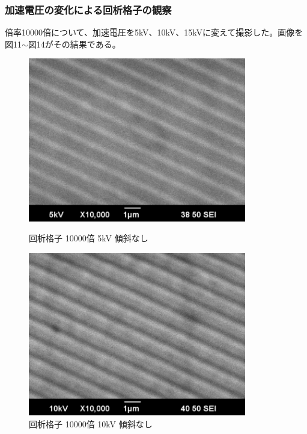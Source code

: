 \documentclass[a4paper,11pt]{jsarticle}
\begin{document}
\subsubsection{加速電圧の変化による回析格子の観察}
倍率10000倍について、加速電圧を5kV、10kV、15kVに変えて撮影した。画像を図11$\sim$図14がその結果である。\\
\begin{figure}[H]
  \begin{minipage}{0.5\hsize}
    \begin{center}
      \includegraphics[width=0.85\textwidth]{figs/0523/kaisetukousi/10000_5kv.pdf}
    \end{center}
    \caption{回析格子 10000倍 5kV 傾斜なし}
  \end{minipage}
  \begin{minipage}{0.5\hsize}
    \begin{center}
      \includegraphics[width=0.85\textwidth]{figs/0523/kaisetukousi/10000_10kv.pdf}
    \end{center}
    \caption{回析格子 10000倍 10kV 傾斜なし}
  \end{minipage}
\end{figure}
\end{document}
